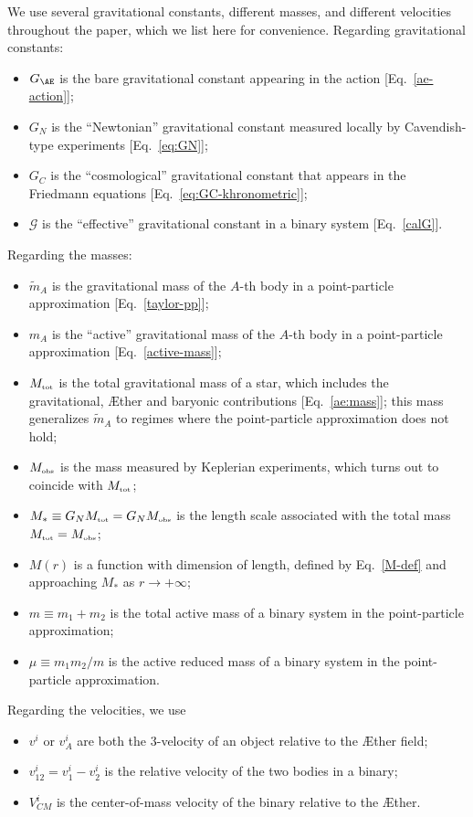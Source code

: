\documentclass[prd,aps,twocolumn,nofootinbib,showpacs,superscriptaddress]{revtex4-1}
\newcommand{\tot}{{\mbox{\tiny tot}}}
\newcommand{\obs}{{\mbox{\tiny obs}}}
\begin{document}
We use several gravitational constants, different masses, and different velocities throughout the paper, which we list here for convenience. Regarding gravitational constants:
\begin{itemize}
\item $G_{\AE}$ is the bare gravitational constant appearing in the action [Eq.~\eqref{ae-action}];
\item $G_N$ is the ``Newtonian'' gravitational constant measured locally by Cavendish-type experiments [Eq.~\eqref{eq:GN}]; 
\item $G_C$ is the ``cosmological'' gravitational constant that appears in the Friedmann equations [Eq.~\eqref{eq:GC-khronometric}]; 
\item $\mathcal{G}$ is the ``effective'' gravitational constant in a binary system [Eq.~\eqref{calG}]. 
\end{itemize}
Regarding the masses:
\begin{itemize}
\item $\tilde{m}_A$ is the gravitational mass of the $A$-th body in a point-particle approximation [Eq.~\eqref{taylor-pp}];
\item $m_A$ is the ``active'' gravitational mass of the $A$-th body in a point-particle approximation [Eq.~\eqref{active-mass}]; 
\item $M_\tot$ is the total gravitational mass of a star, which includes the gravitational, \AE ther and baryonic contributions [Eq.~\eqref{ae:mass}];
this mass generalizes $\tilde{m}_A$ to regimes where the point-particle approximation does not hold;
\item $M_{\obs}$ is the mass measured by Keplerian experiments, which turns out to coincide with $M_{\tot}$;
\item $M_* \equiv G_N M_\tot = G_N M_\obs$ is the length scale associated with the total mass $M_\tot=M_\obs$; 
\item  $M(r)$ is a function with dimension of  length, defined by Eq.~\eqref{M-def} and approaching $M_*$ as $r\to+\infty$;
\item $m \equiv m_1 + m_2$ is the total active mass of a binary system in the point-particle approximation;
\item $\mu \equiv m_1 m_2/m$ is the active reduced mass of a binary system in the point-particle approximation.
\end{itemize}
Regarding the velocities, we use
\begin{itemize}
\item $v^i$ or $v_A^i$ are both the $3$-velocity of an object relative to the \AE ther field;
\item $v_{12}^i = v_1^i - v_2^i$ is the relative velocity of the two bodies in a binary;
\item $V_{CM}^i$ is the center-of-mass velocity of the binary relative to the \AE ther.
\end{itemize}
\end{document}
